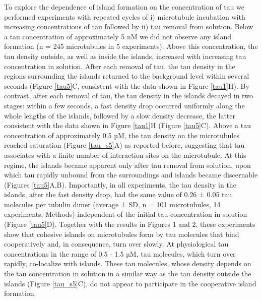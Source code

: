 To explore the dependence of island formation on the concentration of tau we performed experiments with repeated cycles of i) microtubule incubation with increasing concentrations of tau followed by ii) tau removal from solution. Below a tau concentration of approximately 5 nM we did not observe any island formation (n = 245 microtubules in 5 experiments). Above this concentration, the tau density outside, as well as inside the islands, increased with increasing tau concentration in solution. After each removal of tau, the tau density in the regions surrounding the islands returned to the background level within several seconds (Figure \ref{tau5}C, consistent with the data shown in Figure \ref{tau1}H). By contrast, after each removal of tau, the tau density in the islands decayed in two stages: within a few seconds, a fast density drop occurred uniformly along the whole lengths of the islands, followed by a slow density decrease, the latter consistent with the data shown in Figure \ref{tau1}H (Figure \ref{tau5}C). Above a tau concentration of approximately 0.5 µM, the tau density on the microtubules reached saturation (Figure \ref{tau_s5}A) as reported before\parencite{Makrides2004}, suggesting that tau associates with a finite number of interaction sites on the microtubule. At this regime, the islands became apparent only after tau removal from solution, upon which tau rapidly unbound from the surroundings and islands became discernable (Figures \ref{tau5}A,B). Importantly, in all experiments, the tau density in the islands, after the fast density drop, had the same value of 0.26 ± 0.05 tau molecules per tubulin dimer (average ± SD, n = 101 microtubules, 14 experiments, Methods) independent of the initial tau concentration in solution (Figure \ref{tau5}D). Together with the results in Figures 1 and 2, these experiments show that cohesive islands on microtubules form by tau molecules that bind cooperatively and, in consequence, turn over slowly. At physiological tau concentrations\parencite{Wegmann} in the range of 0.5 - 1.5 µM, tau molecules, which turn over rapidly, co-localize with islands. These tau molecules, whose density depends on the tau concentration in solution in a similar way as the tau density outside the islands (Figure \ref{tau_s5}C), do not appear to participate in the cooperative island formation.


